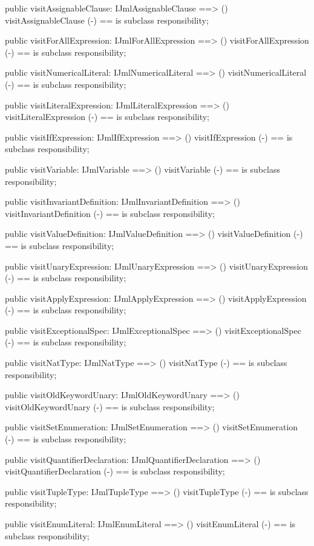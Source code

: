 \begin{vdm_al}
  public visitAssignableClause: IJmlAssignableClause ==> ()
  visitAssignableClause (-) == is subclass responsibility;

  public visitForAllExpression: IJmlForAllExpression ==> ()
  visitForAllExpression (-) == is subclass responsibility;

  public visitNumericalLiteral: IJmlNumericalLiteral ==> ()
  visitNumericalLiteral (-) == is subclass responsibility;

  public visitLiteralExpression: IJmlLiteralExpression ==> ()
  visitLiteralExpression (-) == is subclass responsibility;

  public visitIfExpression: IJmlIfExpression ==> ()
  visitIfExpression (-) == is subclass responsibility;

  public visitVariable: IJmlVariable ==> ()
  visitVariable (-) == is subclass responsibility;

  public visitInvariantDefinition: IJmlInvariantDefinition ==> ()
  visitInvariantDefinition (-) == is subclass responsibility;

  public visitValueDefinition: IJmlValueDefinition ==> ()
  visitValueDefinition (-) == is subclass responsibility;

  public visitUnaryExpression: IJmlUnaryExpression ==> ()
  visitUnaryExpression (-) == is subclass responsibility;

  public visitApplyExpression: IJmlApplyExpression ==> ()
  visitApplyExpression (-) == is subclass responsibility;

  public visitExceptionalSpec: IJmlExceptionalSpec ==> ()
  visitExceptionalSpec (-) == is subclass responsibility;

  public visitNatType: IJmlNatType ==> ()
  visitNatType (-) == is subclass responsibility;

  public visitOldKeywordUnary: IJmlOldKeywordUnary ==> ()
  visitOldKeywordUnary (-) == is subclass responsibility;

  public visitSetEnumeration: IJmlSetEnumeration ==> ()
  visitSetEnumeration (-) == is subclass responsibility;

  public visitQuantifierDeclaration: IJmlQuantifierDeclaration ==> ()
  visitQuantifierDeclaration (-) == is subclass responsibility;

  public visitTupleType: IJmlTupleType ==> ()
  visitTupleType (-) == is subclass responsibility;

  public visitEnumLiteral: IJmlEnumLiteral ==> ()
  visitEnumLiteral (-) == is subclass responsibility;


\end{vdm_al}
